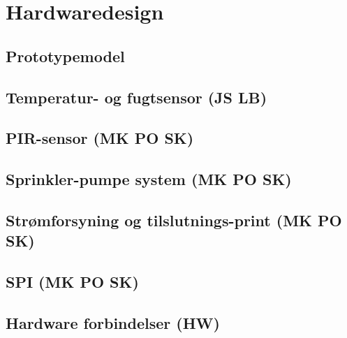 \chapter{Hardwaredesign}

\section{Prototypemodel}


\section{Temperatur- og fugtsensor (JS LB)}


\section{PIR-sensor (MK PO SK)}


\section{Sprinkler-pumpe system (MK PO SK)}


\section{Strømforsyning og tilslutnings-print (MK PO SK)}


\section{SPI (MK PO SK)}


\section{Hardware forbindelser (HW)}
